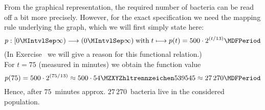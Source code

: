 \begin{MIntro}
\begin{MExample}
\begin{center}
\end{center}

From the graphical representation, the required number of bacteria can be read off a bit more precisely. However, 
for the exact specification we need the mapping rule underlying the graph, which we will first simply state here:
$$p: [0\MIntvlSep \infty) \longrightarrow (0\MIntvlSep  \infty) \;\text{with}\; t \longmapsto p(t) = 500 \cdot 2^{(t/13)} \MDFPeriod$$
(In Exercise~ we will give a reason for this functional relation.)\\
For $t = 75$ (measured in minutes) we obtain the function value
$$p(75) = 500 \cdot 2^{(75/13)} \approx 500 \cdot \MZahl{54}{539545} \approx 27\,270 \MDFPeriod$$
Hence, after $75$~minutes approx. $27\,270$~bacteria live in the considered population.
\end{MExample}
\end{MIntro}


